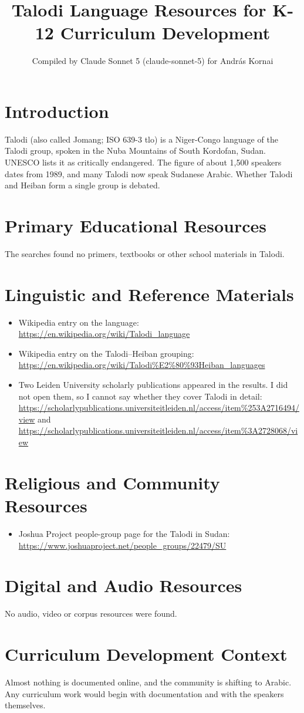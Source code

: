 \documentclass[12pt]{article}
\title{Talodi Language Resources for K-12 Curriculum Development}
\author{Compiled by Claude Sonnet 5 (claude-sonnet-5) for Andr\'as Kornai}
\date{}
\begin{document}
\maketitle

\section{Introduction}
Talodi (also called Jomang; ISO 639-3 tlo) is a Niger-Congo language of the Talodi group, spoken in the Nuba Mountains of South Kordofan, Sudan. UNESCO lists it as critically endangered. The figure of about 1,500 speakers dates from 1989, and many Talodi now speak Sudanese Arabic. Whether Talodi and Heiban form a single group is debated.

\section{Primary Educational Resources}
The searches found no primers, textbooks or other school materials in Talodi.

\section{Linguistic and Reference Materials}
\begin{itemize}
\item Wikipedia entry on the language: \url{https://en.wikipedia.org/wiki/Talodi_language}
\item Wikipedia entry on the Talodi--Heiban grouping: \url{https://en.wikipedia.org/wiki/Talodi%E2%80%93Heiban_languages}
\item Two Leiden University scholarly publications appeared in the results. I did not open them, so I cannot say whether they cover Talodi in detail: \url{https://scholarlypublications.universiteitleiden.nl/access/item%253A2716494/view} and \url{https://scholarlypublications.universiteitleiden.nl/access/item%3A2728068/view}
\end{itemize}

\section{Religious and Community Resources}
\begin{itemize}
\item Joshua Project people-group page for the Talodi in Sudan: \url{https://www.joshuaproject.net/people_groups/22479/SU}
\end{itemize}

\section{Digital and Audio Resources}
No audio, video or corpus resources were found.

\section{Curriculum Development Context}
Almost nothing is documented online, and the community is shifting to Arabic. Any curriculum work would begin with documentation and with the speakers themselves.
\end{document}
